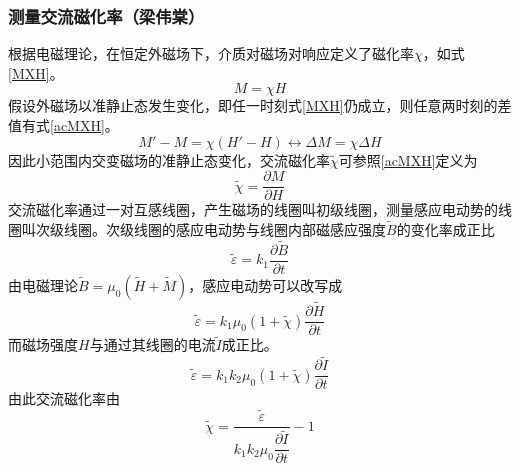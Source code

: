 \documentclass{spaexp}
\begin{document}
            \subsubsection{测量交流磁化率（梁伟棠）}
                根据电磁理论，在恒定外磁场下，介质对磁场对响应定义了磁化率$\chi$，如式\eqref{MXH}。
                \begin{equation}
                    M = \chi H
                    \label{MXH}
                \end{equation}
                假设外磁场以准静止态发生变化，即任一时刻式\eqref{MXH}仍成立，则任意两时刻的差值有式\eqref{acMXH}。
                \begin{equation}
                    M'-M=\chi(H'-H)\leftrightarrow \Delta M = \chi \Delta H
                    \label{acMXH}
                \end{equation}
                因此小范围内交变磁场的准静止态变化，交流磁化率$\tilde{\chi}$可参照\eqref{acMXH}定义为
                \begin{equation}
                    \tilde{\chi} = \dfrac{\partial M}{\partial H}
                    \label{acchi}
                \end{equation}
                交流磁化率通过一对互感线圈，产生磁场的线圈叫初级线圈，测量感应电动势的线圈叫次级线圈。次级线圈的感应电动势与线圈内部磁感应强度$\tilde{B}$的变化率成正比
                \begin{equation}
                    \tilde{\varepsilon} = k_1\dfrac{\partial \tilde{B}}{\partial t}
                \end{equation}
                由电磁理论$\tilde{B}=\mu_0 (\tilde{H}+\tilde{M})$，感应电动势可以改写成
                \begin{equation}
                    \tilde{\varepsilon} = k_1 \mu_0(1+\tilde{\chi})\dfrac{\partial \tilde{H}}{\partial t}
                \end{equation}
                而磁场强度$H$与通过其线圈的电流$\tilde{I}$成正比。
                \begin{equation}
                    \tilde{\varepsilon} = k_1 k_2 \mu_0(1+\tilde{\chi})\dfrac{\partial \tilde{I}}{\partial t}
                \end{equation}
                由此交流磁化率由
                \begin{equation}
                    \tilde{\chi} = \dfrac{\tilde{\varepsilon}}{k_1 k_2\mu_0 \dfrac{\partial \tilde{I}}{\partial t}} - 1
                    \label{meachi}
                \end{equation}
\end{document}
